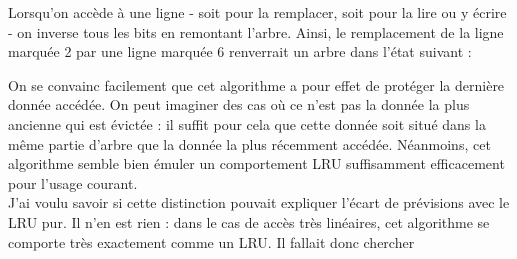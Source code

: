 \documentclass{report}
\begin{document}

Lorsqu'on accède à une ligne - soit pour la remplacer, soit pour la lire ou y écrire -
on inverse tous les bits en remontant l'arbre. Ainsi, le remplacement de la ligne
marquée 2 par une ligne marquée 6 renverrait un arbre dans l'état suivant : 
\\
On se convainc facilement que cet algorithme a pour effet de protéger la dernière 
donnée accédée. On peut imaginer des cas où ce n'est pas la donnée la plus ancienne
qui est évictée : il suffit pour cela que cette donnée soit situé dans la même partie
d'arbre que la donnée la plus récemment accédée. Néanmoins, cet algorithme semble
bien émuler un comportement LRU suffisamment efficacement pour l'usage courant.
\\J'ai voulu savoir si cette distinction pouvait expliquer l'écart de prévisions
avec le LRU pur. Il n'en est rien : dans le cas de accès très linéaires, cet 
algorithme se comporte très exactement comme un LRU. Il fallait donc chercher
\end{document}
